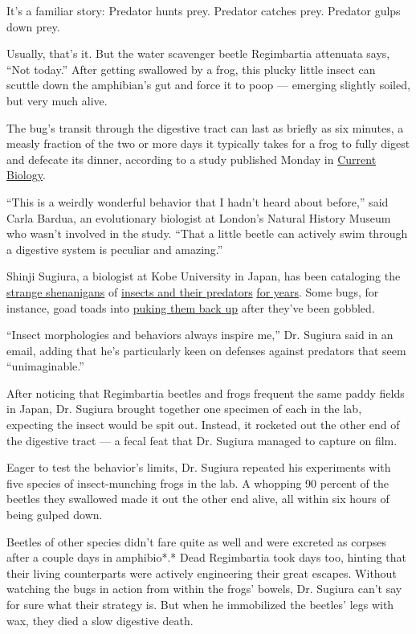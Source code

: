 It's a familiar story: Predator hunts prey. Predator catches prey.
Predator gulps down prey.

Usually, that's it. But the water scavenger beetle Regimbartia attenuata
says, ``Not today.'' After getting swallowed by a frog, this plucky
little insect can scuttle down the amphibian's gut and force it to poop
--- emerging slightly soiled, but very much alive.

The bug's transit through the digestive tract can last as briefly as six
minutes, a measly fraction of the two or more days it typically takes
for a frog to fully digest and defecate its dinner, according to a study
published Monday in
\href{http://dx.doi.org/10.1016/j.cub.2020.06.026}{Current Biology}.

``This is a weirdly wonderful behavior that I hadn't heard about
before,'' said Carla Bardua, an evolutionary biologist at London's
Natural History Museum who wasn't involved in the study. ``That a little
beetle can actively swim through a digestive system is peculiar and
amazing.''

Shinji Sugiura, a biologist at Kobe University in Japan, has been
cataloging the
\href{https://royalsocietypublishing.org/doi/10.1098/rsbl.2017.0647}{strange
shenanigans} of \href{https://peerj.com/articles/5942/}{insects and
their predators}
\href{https://onlinelibrary.wiley.com/doi/abs/10.1111/ens.12423}{for
years}. Some bugs, for instance, goad toads into
\href{https://www.nytimes3xbfgragh.onion/2018/02/06/science/bombardier-beetle-toad-vomit.html}{puking
them back up} after they've been gobbled.

``Insect morphologies and behaviors always inspire me,'' Dr. Sugiura
said in an email, adding that he's particularly keen on defenses against
predators that seem ``unimaginable.''

After noticing that Regimbartia beetles and frogs frequent the same
paddy fields in Japan, Dr. Sugiura brought together one specimen of each
in the lab, expecting the insect would be spit out. Instead, it rocketed
out the other end of the digestive tract --- a fecal feat that Dr.
Sugiura managed to capture on film.

Eager to test the behavior's limits, Dr. Sugiura repeated his
experiments with five species of insect-munching frogs in the lab. A
whopping 90 percent of the beetles they swallowed made it out the other
end alive, all within six hours of being gulped down.

Beetles of other species didn't fare quite as well and were excreted as
corpses after a couple days in amphibio*.* Dead Regimbartia took days
too, hinting that their living counterparts were actively engineering
their great escapes. Without watching the bugs in action from within the
frogs' bowels, Dr. Sugiura can't say for sure what their strategy is.
But when he immobilized the beetles' legs with wax, they died a slow
digestive death.

